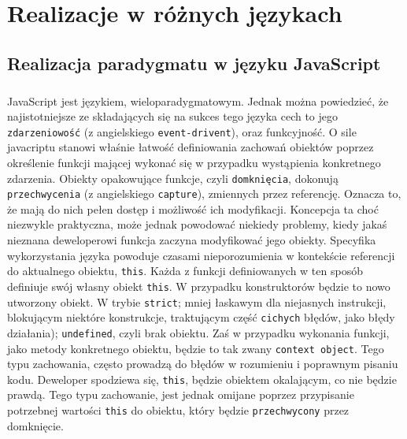 \documentclass[a4paper,10pt]{report}
\begin{document}
\chapter{Realizacje w różnych językach}
\section{Realizacja paradygmatu w języku JavaScript}
\paragraph{}
JavaScript jest językiem, wieloparadygmatowym. Jednak można powiedzieć, że najistotniejsze ze składających się na sukces tego języka cech to jego \verb|zdarzeniowość| (z angielskiego \verb|event-drivent|), oraz funkcyjność. O sile javacriptu stanowi właśnie łatwość definiowania zachowań obiektów poprzez określenie funkcji mającej wykonać się w przypadku wystąpienia konkretnego zdarzenia. Obiekty opakowujące funkcje, czyli \verb|domknięcia|, dokonują \verb|przechwycenia| (z angielskiego \verb|capture|), zmiennych przez referencję. Oznacza to, że mają do nich pełen dostęp i możliwość ich modyfikacji. Koncepcja ta choć niezwykle praktyczna, może jednak powodować niekiedy problemy, kiedy jakaś nieznana deweloperowi funkcja zaczyna modyfikować jego obiekty. Specyfika wykorzystania języka powoduje czasami nieporozumienia w kontekście referencji do aktualnego obiektu, \verb|this|. Każda z funkcji definiowanych w ten sposób definiuje swój własny obiekt \verb|this|. W przypadku konstruktorów będzie to nowo utworzony obiekt. W trybie \verb|strict|; mniej łaskawym dla niejasnych instrukcji, blokującym niektóre konstrukcje, traktującym część \verb|cichych| błędów, jako błędy działania); \verb|undefined|, czyli brak obiektu. Zaś w przypadku wykonania funkcji, jako metody konkretnego obiektu, będzie to tak zwany \verb|context object|. Tego typu zachowania, często prowadzą do błędów w rozumieniu i poprawnym pisaniu kodu. Deweloper spodziewa się, \verb|this|, będzie obiektem okalającym, co nie będzie prawdą. Tego typu zachowanie, jest jednak omijane poprzez przypisanie potrzebnej wartości \verb|this| do obiektu, który będzie \verb|przechwycony| przez domknięcie.
\end{document}
